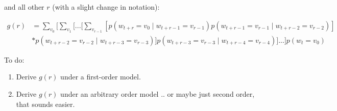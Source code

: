 \documentclass[11pt,letterpaper]{article}
\theoremstyle{definition}
\begin{document}
and all other $r$ (with a slight change in notation):

\begin{align} g(r) &= \sum_{v_0}[ \sum_{v_1} [ ... [ \sum_{v_{r-1}} [ p(w_{t+r} = v_0 \mid w_{t+r-1} = v_{r-1}) p(w_{t+r-1} = v_{r-1} \mid w_{t+r-2} = v_{r-2})] \\
&* p(w_{t+r-2} = v_{r-2} \mid w_{t+r-3} = v_{r-3})] p(w_{t+r-3} = v_{r-3} \mid w_{t+r-4} = v_{r-4})] ... ] p(w_t = v_0) 
\end{align}








To do:
\begin{enumerate}
\item Derive $g(r)$ under a first-order model.
\item Derive $g(r)$ under an arbitrary order model .. or maybe just second order, that sounds easier.
\end{enumerate}


% 
% 
\end{document}
